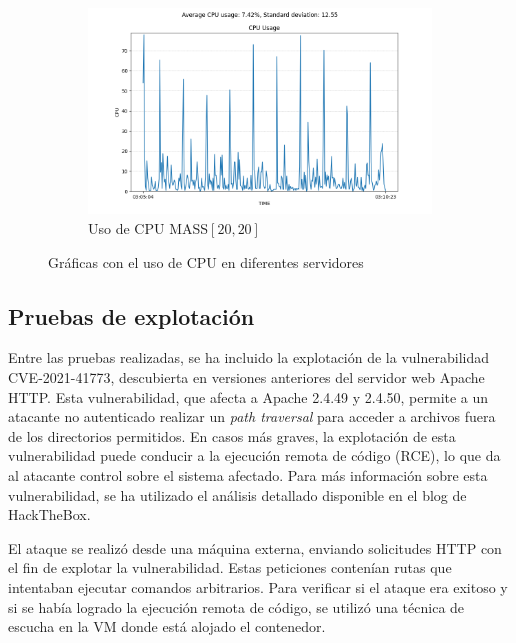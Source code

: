 \begin{figure}[H]
        \begin{subfigure}[H]{0.45\textwidth}
            \centering
            \includegraphics[width=\textwidth]{./imagenes/mtd-no-petition_u20_l20.csv.png} 
            \caption{Uso de CPU MASS$[20,20]$}
            \label{fig:imagen5}
        \end{subfigure}
        \caption{Gráficas con el uso de CPU en diferentes servidores}
    \end{figure}
    
    

\subsection{Pruebas de explotación}
Entre las pruebas realizadas, se ha incluido la explotación de la vulnerabilidad CVE-2021-41773, descubierta en versiones anteriores del servidor web Apache HTTP. Esta vulnerabilidad, que afecta a Apache 2.4.49 y 2.4.50, permite a un atacante no autenticado realizar un \textit{path traversal} para acceder a archivos fuera de los directorios permitidos. En casos más graves, la explotación de esta vulnerabilidad puede conducir a la ejecución remota de código (RCE), lo que da al atacante control sobre el sistema afectado. Para más información sobre esta vulnerabilidad, se ha utilizado el análisis detallado disponible en el blog de HackTheBox\cite{cve-2021-41773}.

El ataque se realizó desde una máquina externa, enviando solicitudes HTTP con el fin de explotar la vulnerabilidad. Estas peticiones contenían rutas que intentaban ejecutar comandos arbitrarios. Para verificar si el ataque era exitoso y si se había logrado la ejecución remota de código, se utilizó una técnica de escucha en la VM donde está alojado el contenedor.

